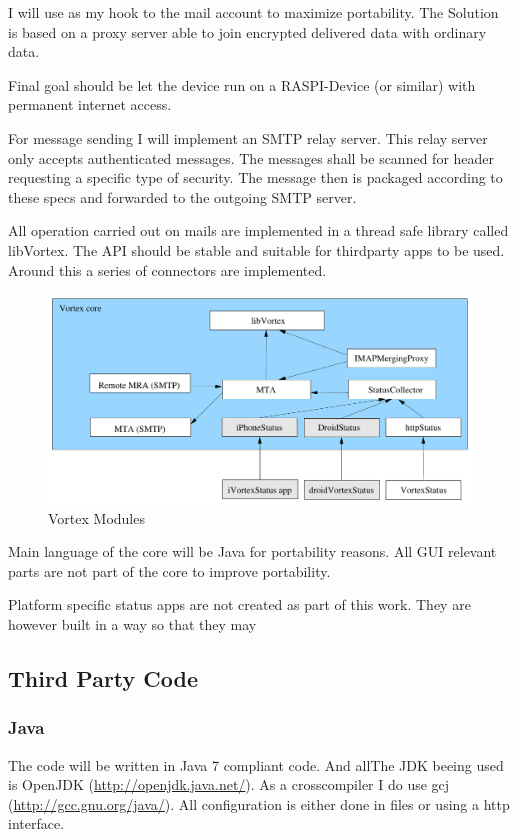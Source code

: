 I will use  as my hook to the mail account to maximize portability. The Solution is based on a  proxy server able to join encrypted delivered data with ordinary data.\par

Final goal should be let the device run on a RASPI-Device (or similar) with permanent internet access. \par

For message sending I will implement an SMTP relay server. This relay server only accepts authenticated messages. The messages shall be scanned for header requesting a specific type of security. The message then is packaged according to these specs and forwarded to the outgoing SMTP server.

All operation carried out on mails are implemented in a thread safe library called libVortex. The API should be stable and suitable for thirdparty apps to be used. Around this a series of connectors are implemented.

\begin{figure}[ht!]
  \centering\includegraphics[width=\textwidth]{inc/VortexModules}
  \caption{Vortex Modules}\label{fig:VortexModules}
\end{figure}

Main language of the core will be Java for portability reasons. All GUI relevant parts are not part of the core to improve portability.\par

Platform specific status apps are not created as part of this work. They are however built in a way so that they may

\subsection{Third Party Code}
\subsubsection{Java}
The code will be written in Java 7 compliant code. And allThe JDK beeing used is OpenJDK (\url{http://openjdk.java.net/}). As a crosscompiler I do use gcj (\url{http://gcc.gnu.org/java/}). All configuration is either done in files or using a http interface.


